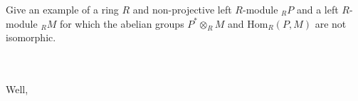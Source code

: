 Give an example of a ring $R$ and non-projective left $R$-module $_RP$ and a left $R$-module $_RM$ for
which the abelian groups $P^*\otimes_RM$ and $\text{Hom}_R(P,M)$ are not isomorphic.\\\\

\begin{solution}\renewcommand{\qedsymbol}{}\ \\
    Well,
\end{solution}